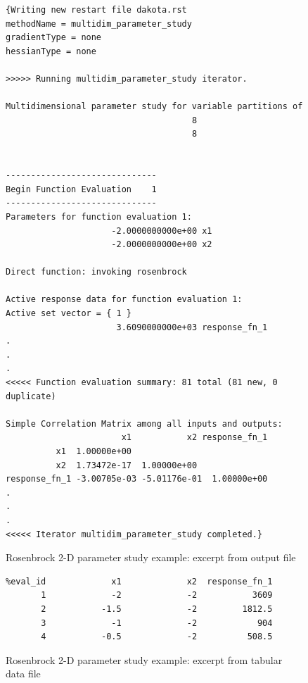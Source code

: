 \begin{figure}[ht!]
\label{tutorial:quickstart:rosenbrock_multidim:output}
\caption{Rosenbrock 2-D parameter study example: excerpt from output file}
  \centering
  \begin{bigbox}
    \begin{small}
      \begin{verbatim}
{Writing new restart file dakota.rst
methodName = multidim_parameter_study
gradientType = none
hessianType = none

>>>>> Running multidim_parameter_study iterator.

Multidimensional parameter study for variable partitions of
                                     8
                                     8


------------------------------
Begin Function Evaluation    1
------------------------------
Parameters for function evaluation 1:
                     -2.0000000000e+00 x1
                     -2.0000000000e+00 x2

Direct function: invoking rosenbrock 

Active response data for function evaluation 1:
Active set vector = { 1 }
                      3.6090000000e+03 response_fn_1
.
.
.
<<<<< Function evaluation summary: 81 total (81 new, 0 duplicate)

Simple Correlation Matrix among all inputs and outputs:
                       x1           x2 response_fn_1 
          x1  1.00000e+00 
          x2  1.73472e-17  1.00000e+00 
response_fn_1 -3.00705e-03 -5.01176e-01  1.00000e+00 
. 
.
.
<<<<< Iterator multidim_parameter_study completed.}
\end{verbatim}
    \end{small}
  \end{bigbox}
\end{figure}


\begin{figure}[ht!]
\label{tutorial:quickstart:rosenbrock_multidim:dat}
\caption{Rosenbrock 2-D parameter study example: excerpt from tabular data file}
  \centering
  \begin{bigbox}
    \begin{small}
      \begin{verbatim}
%eval_id             x1             x2  response_fn_1 
       1             -2             -2           3609 
       2           -1.5             -2         1812.5 
       3             -1             -2            904 
       4           -0.5             -2          508.5 
\end{verbatim}
    \end{small}
  \end{bigbox}
\end{figure}


